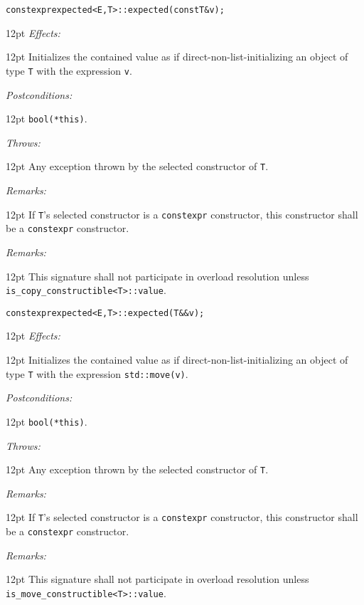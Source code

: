 \documentclass[a4paper,10pt]{article}
\newcommand{\cpp}[1]{\lstinline{#1}}
\newcommand{\wordingItem}[1]{\noindent\textit{#1:}}
\newenvironment{wordingTextItem}[1]{\wordingItem{#1}\vspace{2pt}\noindent\begin{adjustwidth}{12pt}{}}{\vspace{2pt}\end{adjustwidth}}
\newenvironment{wordingPara}{\begin{adjustwidth}{12pt}{}}{\end{adjustwidth}}
\newcommand{\suppress}[1]{\colorbox{suppress_color}{#1}}
\begin{document}
\begin{alltt}
constexpr \suppress{expected<E,T>::}expected(const T& v);
\end{alltt}
\begin{wordingPara}
\begin{wordingTextItem}{Effects}
Initializes the contained value as if direct-non-list-initializing an object of type \cpp{T} with the expression \cpp{v}.
\end{wordingTextItem}
\begin{wordingTextItem}{Postconditions}
\cpp{bool(*this)}.
\end{wordingTextItem}
\begin{wordingTextItem}{Throws}
Any exception thrown by the selected constructor of \cpp{T}.
\end{wordingTextItem}
\begin{wordingTextItem}{Remarks}
If \cpp{T}'s selected constructor is a \cpp{constexpr} constructor, this constructor shall be a \cpp{constexpr} constructor.
\end{wordingTextItem}
\begin{wordingTextItem}{Remarks}
This signature shall not participate in overload resolution unless\\
\cpp{is_copy_constructible<T>::value}. 
\end{wordingTextItem}
\end{wordingPara}

\begin{alltt}
constexpr \suppress{expected<E,T>::}expected(T&& v); 
\end{alltt}
\begin{wordingPara}
\begin{wordingTextItem}{Effects}
Initializes the contained value as if direct-non-list-initializing an object of type \cpp{T} with the expression \cpp{std::move(v)}.
\end{wordingTextItem}
\begin{wordingTextItem}{Postconditions}
\cpp{bool(*this)}.
\end{wordingTextItem}
\begin{wordingTextItem}{Throws}
Any exception thrown by the selected constructor of \cpp{T}.
\end{wordingTextItem}
\begin{wordingTextItem}{Remarks}
If \cpp{T}'s selected constructor is a \cpp{constexpr} constructor, this constructor shall be a \cpp{constexpr} constructor.
\end{wordingTextItem}
\begin{wordingTextItem}{Remarks}
This signature shall not participate in overload resolution unless\\
\cpp{is_move_constructible<T>::value}.
\end{wordingTextItem}
\end{wordingPara}
\end{document}
